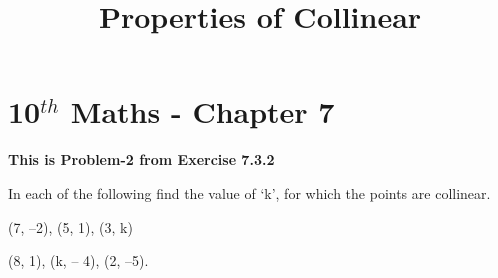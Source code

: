 \documentclass[journal,10pt,twocolumn]{article}
\begin{document}
\begin{center}
\title{\textbf{Properties of Collinear}}
\date{\vspace{-5ex}} %
\maketitle
\end{center}
\setcounter{page}{1}
\section{10$^{th}$ Maths - Chapter 7}
\textbf{This is Problem-2 from Exercise 7.3.2}
\item In each of the following find the value of ‘k’, for which the points are collinear.

\item (7, –2), (5, 1), (3, k) \\
\item (8, 1), (k, – 4), (2, –5).\\
\fi
\end{document}
